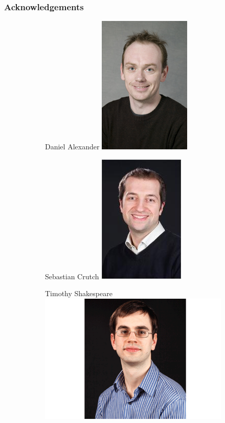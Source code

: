 \documentclass[10pt,xcolor=table]{beamer}
\begin{document}
\begin{frame}
\frametitle{Acknowledgements}

\begin{figure}
 \begin{subfigure}{0.32\textwidth}
 \centering
 Daniel Alexander
 \includegraphics[scale=0.35]{Danny-Alexander.jpeg}  
 \end{subfigure}
  \begin{subfigure}{0.32\textwidth}
  \centering
  Sebastian Crutch
 \includegraphics[scale=0.35]{Seb_Crutch_photo.JPG}  
 \end{subfigure}
  \begin{subfigure}{0.32\textwidth}
  \centering
  Timothy Shakespeare
 \includegraphics[scale=0.2]{tim_photo.png}  
 \end{subfigure}
 \vspace{1em}
 

\end{figure}
\end{frame}
\end{document}
